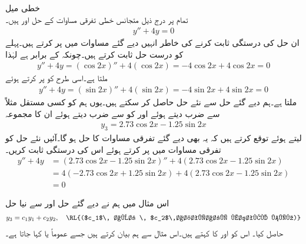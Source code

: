 \quad خطی میل\\
تمام  پر درج ذیل متجانس خطی تفرقی مساوات کے حل  اور  ہیں۔
\begin{align}
y''+4y=0
\end{align}
ان حل کی درستگی ثابت کرنے کی خاطر انہیں دیے گئے مساوات میں پر کرتے ہیں۔پہلے  کو درست حل ثابت کرتے ہیں۔چونکہ  کے برابر ہے لہٰذا 
\begin{align*}
y''+4y=(\cos 2x)''+4(\cos 2x)=-4\cos 2x+4\cos 2x=0
\end{align*}
ملتا ہے۔اسی طرح  کو پر کرتے ہوئے 
\begin{align*}
y''+4y=(\sin 2x)''+4(\sin 2x)=-4\sin 2x+4\sin 2x=0
\end{align*}
ملتا ہے۔ہم دیے گئے حل سے نئے حل حاصل کر سکتے ہیں۔یوں ہم  کو کسی مستقل مثلاً  سے ضرب دیتے ہوئے اور  کو   سے ضرب دیتے ہوئے ان کا مجموعہ
\begin{align*}
y_3=2.73\cos 2x-1.25\sin 2x
\end{align*}
لیتے ہوئے  توقع کرتے ہیں کہ یہ بھی دیے گئے تفرقی مساوات کا حل ہو گا۔آئیں نئے حل کو تفرقی مساوات میں پر کرتے ہوئے اس کی درستگی ثابت کریں۔
\begin{align*}
y''+4y&=(2.73\cos 2x-1.25\sin 2x)''+4(2.73\cos 2x-1.25\sin 2x)\\
&=4(-2.73\cos 2x+1.25\sin 2x)+4(2.73\cos 2x-1.25\sin 2x)\\
&=0
\end{align*}

اس مثال میں ہم نے دیے گئے حل  اور  سے نیا حل 
\begin{align}
y_3=c_1 y_1+c_2 y_2, \quad \text{\RL{($c_1$\, اور \, $c_2$\,اختیاری مستقل ہیں)}}
\end{align}
حاصل کیا۔ اس کو  اور  کا  کہتے ہیں۔اس مثال سے ہم  بیان کرتے ہیں جسے عموماً  یا  کہا جاتا ہے۔


